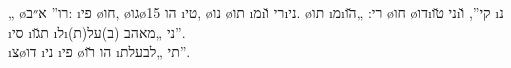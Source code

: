 %
{„ \o{רו}”  א״ב: \i{פי}  \o{חו}, \o{גו}\o{הו} 15 \i{טי}, \o{נו} \o{תו}  \i{מ}\i{רי} \u{ו}\i{ני}. \o{תו} \i{מ}\i{רי}: „\u{הו} \o{חו} \o{דו}\i{ני} \u{טו}\i{קי}”, \u{ו} \i{נ}  \i{סי} \i{ת}\u{גו} \i{ל}\i{ני} „מאהב (ב)על(ת)”.\\
\i{צ}\o{דו} \i{ני}  \i{פי}  \o{הו} \u{רו}  \i{תי} „לבעלת”.}%
